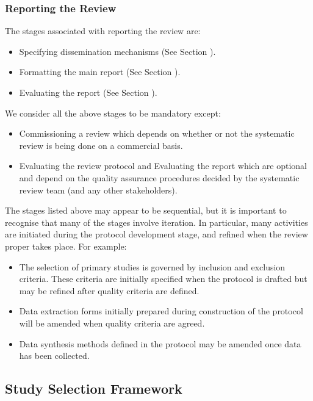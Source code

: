 \subsubsection{Reporting the Review}
The stages associated with reporting the review are:
\begin{itemize}
    \item Specifying dissemination mechanisms (See Section ).
    \item Formatting the main report (See Section ).
    \item Evaluating the report (See Section ).
\end{itemize}

We consider all the above stages to be mandatory except:
\begin{itemize}
    \item Commissioning a review which depends on whether or not the systematic review is being done on a commercial basis.
    \item Evaluating the review protocol and Evaluating the report which are optional and depend on the quality assurance procedures decided by the systematic review team (and any other stakeholders).
\end{itemize}

The stages listed above may appear to be sequential, but it is important to recognise that many of the stages involve iteration. In particular, many activities are initiated during the protocol development stage, and refined when the review proper takes place. For example:
\begin{itemize}
    \item The selection of primary studies is governed by inclusion and exclusion criteria. These criteria are initially specified when the protocol is drafted but may be refined after quality criteria are defined.
    \item Data extraction forms initially prepared during construction of the protocol will be amended when quality criteria are agreed.
    \item Data synthesis methods defined in the protocol may be amended once data has been collected.
\end{itemize}

\subsection{Study Selection Framework}
\label{sec:study-selection}

